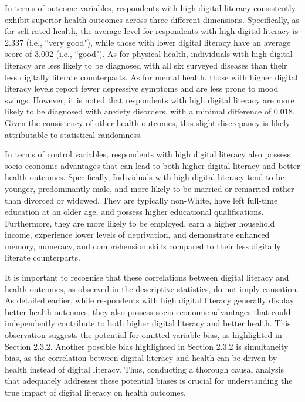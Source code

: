 In terms of outcome variables, respondents with high digital literacy consistently exhibit superior health outcomes across three different dimensions. Specifically, as for self-rated health, the average level for respondents with high digital literacy is 2.337 (i.e., ``very good"), while those with lower digital literacy have an average score of 3.002 (i.e., ``good"). As for physical health, individuals with high digital literacy are less likely to be diagnosed with all six surveyed diseases than their less digitally literate counterparts. As for mental health, those with higher digital literacy levels report fewer depressive symptoms and are less prone to mood swings. However, it is noted that respondents with high digital literacy are more likely to be diagnosed with anxiety disorders, with a minimal difference of 0.018. Given the consistency of other health outcomes, this slight discrepancy is likely attributable to statistical randomness.

In terms of control variables, respondents with high digital literacy also possess socio-economic advantages that can lead to both higher digital literacy and better health outcomes. Specifically, Individuals with high digital literacy tend to be younger, predominantly male, and more likely to be married or remarried rather than divorced or widowed. They are typically non-White, have left full-time education at an older age, and possess higher educational qualifications. Furthermore, they are more likely to be employed, earn a higher household income, experience lower levels of deprivation, and demonstrate enhanced memory, numeracy, and comprehension skills compared to their less digitally literate counterparts.

It is important to recognise that these correlations between digital literacy and health outcomes, as observed in the descriptive statistics, do not imply causation. As detailed earlier, while respondents with high digital literacy generally display better health outcomes, they also possess socio-economic advantages that could independently contribute to both higher digital literacy and better health. This observation suggests the potential for omitted variable bias, as highlighted in Section 2.3.2. Another possible bias highlighted in Section 2.3.2 is simultaneity bias, as the correlation between digital literacy and health can be driven by health instead of digital literacy. Thus, conducting a thorough causal analysis that adequately addresses these potential biases is crucial for understanding the true impact of digital literacy on health outcomes.


